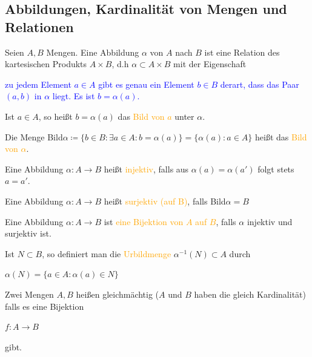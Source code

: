 \subsection[]{Abbildungen, Kardinalität von Mengen und Relationen}
\begin{definition}
Seien $A,B$ Mengen. Eine Abbildung $\alpha$ von $A$ nach $B$ ist eine Relation des kartesischen Produkts $A \times B$, d.h $\alpha \subset A \times B$ mit der Eigenschaft
\begin{center}
    \textcolor{blue}{zu jedem Element $a \in A$ gibt es genau ein Element $b \in B$ derart, dass das Paar $(a,b)$ in $\alpha$ liegt. Es ist $b = \alpha(a)$.}
\end{center}
\end{definition}
\begin{definition}
Ist $a \in A$, so heißt $b=\alpha(a)$ das \textcolor{orange}{Bild von $a$} unter $\alpha$.
\end{definition}
\begin{definition}
Die Menge Bild$\alpha \coloneqq \{ b \in B : \exists a \in A : b = \alpha(a)\} = \{ \alpha(a) : a \in A\}$ heißt das \textcolor{orange}{Bild von $\alpha$}.
\end{definition}
\begin{definition}
Eine Abbildung $\alpha:A \rightarrow B$ heißt \textcolor{orange}{injektiv}, falls aus $\alpha(a) = \alpha(a')$ folgt stets $a = a'$.
\end{definition}
\begin{definition}
Eine Abbildung $\alpha:A \rightarrow B$ heißt \textcolor{orange}{surjektiv (auf B)}, falls Bild$\alpha = B$
\end{definition}
\begin{definition}
Eine Abbildung $\alpha:A \rightarrow B$ ist \textcolor{orange}{eine Bijektion von $A$ auf $B$}, falls $\alpha$ injektiv und surjektiv ist.
\end{definition}
\begin{definition}
Ist $N \subset B$, so definiert man die \textcolor{orange}{Urbildmenge} $\alpha^{-1}(N) \subset A$ durch 
\begin{center}
    $\alpha(N) =  \{a \in A : \alpha(a) \in N\}$
\end{center}
\end{definition}
\begin{definition}
Zwei Mengen $A,B$ heißen gleichmächtig ($A$ und $B$ haben die gleich Kardinalität) falls es eine Bijektion 
\begin{center}
    $f : A \rightarrow B$
\end{center}
gibt.
\end{definition}

